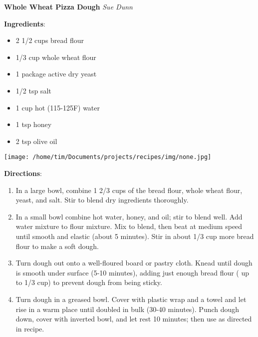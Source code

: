 \documentclass[11pt, twoside, openany]{book}
\begin{document}
\noindent\begin{minipage}[t]{\linewidth}%
{\Large\textbf{Whole Wheat Pizza Dough}} \label{whole-wheat-pizza-dough}\hfill\textit{Sue Dunn}\\
\noindent\begin{minipage}[t]{0.78\linewidth}%
\textbf{Ingredients}:\vspace{-3mm}
\begin{multicols}{2}
\begin{itemize}\setlength\itemsep{-1mm}
\item 2 1/2 cups bread flour
\item 1/3 cup whole wheat flour
\item 1 package active dry yeast
\item 1/2 tsp salt
\item 1 cup hot (115-125F) water
\item 1 tsp honey
\item 2 tsp olive oil
\end{itemize}
\end{multicols}
\end{minipage}
\noindent\begin{minipage}[t]{0.18\linewidth}
\centering \strut\vspace*{-\baselineskip}\newline
\texttt{[image: /home/tim/Documents/projects/recipes/img/none.jpg]}\\
\end{minipage}\vspace{3mm}
\textbf{Directions}:
\vspace{-3mm}\begin{enumerate}\setlength\itemsep{-1mm}
\item In a large bowl, combine 1 2/3 cups of the bread flour, whole wheat flour, yeast, and salt. Stir to blend dry ingredients thoroughly.
\item In a small bowl combine hot water, honey, and oil; stir to blend well. Add water mixture to flour mixture. Mix to blend, then beat at medium speed until smooth and elastic (about 5 minutes). Stir in about 1/3 cup more bread flour to make a soft dough.
\item Turn dough out onto a well-floured board or pastry cloth. Knead until dough is smooth under surface (5-10 minutes), adding just enough bread flour ( up to 1/3 cup) to prevent dough from being sticky.
\item Turn dough in a greased bowl. Cover with plastic wrap and a towel and let rise in a warm place until doubled in bulk (30-40 minutes). Punch dough down, cover with inverted bowl, and let rest 10 minutes; then use as directed in recipe.
\end{enumerate}
\end{minipage}\vspace{8mm}
\end{document}

